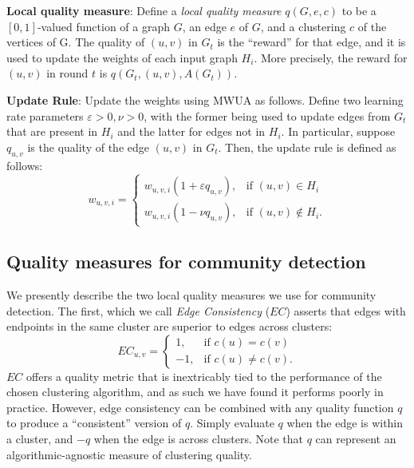 \documentclass{IEEEtran}
\begin{document}
\textbf{Local quality measure}: Define a \emph{local quality measure}
$q(G,e,c)$ to be a $[0,1]$-valued function of a graph $G$, an edge $e$ of $G$,
and a clustering $c$ of the vertices of G. The quality of $(u,v)$ in $G_t$ is
the ``reward'' for that edge, and it is used to update the weights of each
input graph $H_i$.  More precisely, the reward for $(u,v)$ in round $t$ is
$q(G_t, (u,v),A(G_t))$.

\textbf{Update Rule}: Update the weights using MWUA as follows. Define two
learning rate parameters $\varepsilon > 0, \nu > 0$, with the former being used
to update edges from $G_t$ that are present in $H_i$ and the latter for edges
not in $H_i$. In particular, suppose $q_{u,v}$ is the quality of the edge
$(u,v)$ in $G_t$. Then, the update rule is defined as follows:
\[
w_{u,v,i}=
\begin{cases}
w_{u,v,i}(1 +\varepsilon q_{u,v}), & \text{if } (u,v) \in H_i \\
w_{u,v,i}(1 - \nu q_{u,v}), & \text{if } (u,v) \not \in H_i .
\end{cases}
\]
 
\subsection{Quality measures for community detection}
\label{sec:quality-measures}
We presently describe the two local quality measures we use for community
detection. The first, which we call {\em Edge Consistency} ($EC$) asserts that
edges with endpoints in the same cluster are superior to edges across clusters:
\[
   EC_{u,v}=
   \begin{cases}
   1, & \text{if  }c(u) = c(v) \\
   -1,  & \text{if  }c(u) \neq c(v).
   \end{cases}
\]
$EC$ offers a quality metric that is inextricably tied to the performance of
the chosen clustering algorithm, and as such we have found it performs poorly
in practice. However, edge consistency can be combined with any quality
function $q$ to produce a ``consistent'' version of $q$. Simply evaluate $q$
when the edge is within a cluster, and $-q$ when the edge is across clusters.
Note that $q$ can represent an algorithmic-agnostic measure of clustering
quality. 
\end{document}
